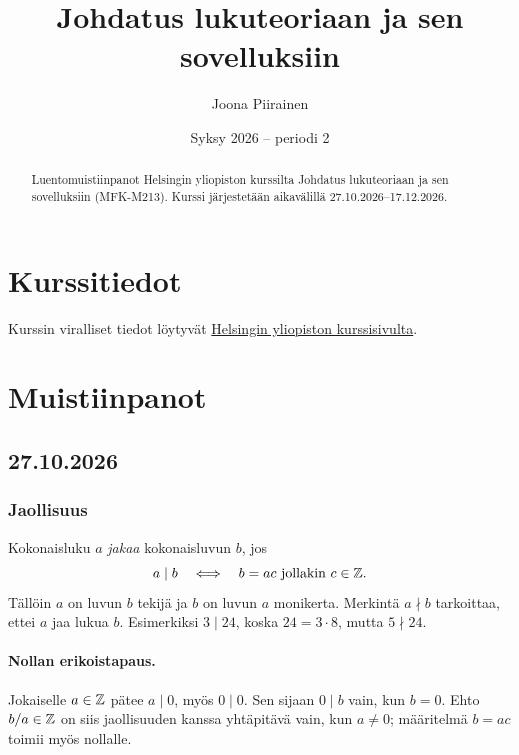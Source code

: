 \documentclass[11pt,a4paper]{amsart}
\title{Johdatus lukuteoriaan ja sen sovelluksiin}
\author{Joona Piirainen}
\date{Syksy 2026 -- periodi 2}
\begin{document}
\begin{abstract}
  Luentomuistiinpanot Helsingin yliopiston kurssilta
  Johdatus lukuteoriaan ja sen sovelluksiin (MFK-M213).
  Kurssi järjestetään aikavälillä 27.10.2026--17.12.2026.
\end{abstract}

\maketitle

\tableofcontents

\section{Kurssitiedot}

Kurssin viralliset tiedot löytyvät
\href{https://studies.helsinki.fi/kurssit/opintojakso/otm-989530ba-4d33-4184-bfc4-3d0ed8799643/MFK-M213}{Helsingin
yliopiston kurssisivulta}.

\section{Muistiinpanot}

\subsection{27.10.2026}

\subsubsection{Jaollisuus}

Kokonaisluku $a$ \emph{jakaa} kokonaisluvun $b$, jos
\[
  a\mid b \quad\Longleftrightarrow\quad
  b=ac \text{ jollakin } c\in\mathbb{Z}.
\]
Tällöin $a$ on luvun $b$ tekijä ja $b$ on luvun $a$ monikerta.
Merkintä $a\nmid b$ tarkoittaa, ettei $a$ jaa lukua $b$.
Esimerkiksi $3\mid 24$, koska $24=3\cdot 8$, mutta $5\nmid 24$.

\paragraph{Nollan erikoistapaus.}
Jokaiselle $a\in\mathbb{Z}$ pätee $a\mid 0$, myös $0\mid 0$.
Sen sijaan $0\mid b$ vain, kun $b=0$.
Ehto $b/a\in\mathbb{Z}$ on siis jaollisuuden kanssa yhtäpitävä vain, kun
$a\ne 0$; määritelmä $b=ac$ toimii myös nollalle.
\end{document}
